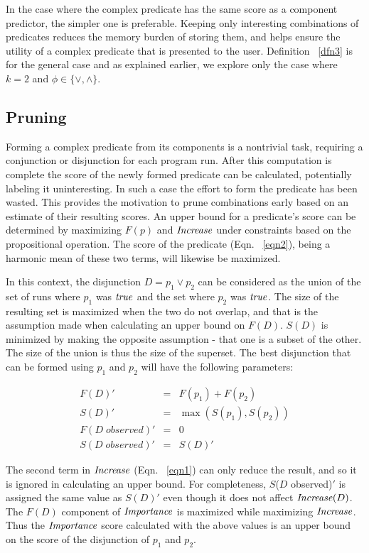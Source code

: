 In the case where the complex predicate has the same score as a component predictor, the simpler one is preferable.  Keeping only interesting combinations of predicates reduces the memory burden of storing them, and helps ensure the utility of a complex predicate that is presented to the user.  Definition ~\ref{dfn3} is for the general case and as explained earlier, we explore only the case where $k = 2$ and $\phi \in \{\vee, \wedge\}$.

\subsection{Pruning}
\label{sec-pruning}
Forming a complex predicate from its components is a nontrivial task, requiring a conjunction or disjunction for each program run.  After this computation is complete the score of the newly formed predicate can be calculated, potentially labeling it uninteresting.  In such a case the effort to form the predicate has been wasted.  This provides the motivation to prune combinations early based on an estimate of their resulting scores.  An upper bound for a predicate's score can be determined by maximizing $F(p)$ and $\mathit{Increase}$ under constraints based on the propositional operation.  The score of the predicate (Eqn. ~\ref{eqn2}), being a harmonic mean of these two terms, will likewise be maximized.

In this context, the disjunction $D = p_1 \vee p_2$ can be considered as the union of the set of runs where $p_1$ was $\mathit{true}$ and the set where $p_2$ was $\mathit{true}$.  The size of the resulting set is maximized when the two do not overlap, and that is the assumption made when calculating an upper bound on $F(D)$.  $S(D)$ is minimized by making the opposite assumption - that one is a subset of the other.  The size of the union is thus the size of the superset.  The best disjunction that can be formed using $p_1$ and $p_2$ will have the following parameters:

\begin{eqnarray*}
  F(D)' &=&  F(p_1) + F(p_2) \\
  S(D)' &=&  \max(S(p_1),S(p_2)) \\
  F(D\;observed)' &=& 0 \\
  S(D\;observed)' &=& S(D)'
\end{eqnarray*}

The second term in $\mathit{Increase}$ (Eqn. ~\ref{eqn1}) can only reduce the result, and so it is ignored in calculating an upper bound.  For completeness, $S$($D$ observed)$'$ is assigned the same value as $S(D)'$ even though it does not affect $\mathit{Increase}(D)$.  The $F(D)$ component of $\mathit{Importance}$ is maximized while maximizing $\mathit{Increase}$.  Thus the $\mathit{Importance}$ score calculated with the above values is an upper bound on the score of the disjunction of $p_1$ and $p_2$.

